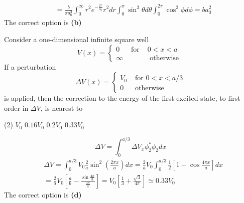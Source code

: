 \begin{enumerate}
\begin{answer}
\begin{align*}
	&=\frac{b}{\pi a_{0}^{3}} \int_{0}^{\infty} r^{2} e^{-\frac{2 r}{a_{0}}} r^{2} d r \int_{0}^{\pi} \sin ^{3} \theta d \theta \int_{0}^{2 \pi} \cos ^{2} \phi d \phi=b a_{0}^{2}
	\end{align*}
	The correct option is \textbf{(b)}
\end{answer}
\begin{minipage}{\textwidth}
	\item Consider a one-dimensional infinite square well
	$$
	V(x)=\left\{\begin{array}{lll}
	0 & \text { for } & 0<x<a \\
	\infty & & \text { otherwise }
	\end{array}\right.
	$$
	If a perturbation
	$$
	\Delta V(x)=\left\{\begin{array}{lc}
	V_{0} & \text { for } 0<x<a / 3 \\
	0 & \text { otherwise }
	\end{array}\right.
	$$
	is applied, then the correction to the energy of the first excited state, to first order in $\Delta V$, is nearest to
\end{minipage}
\begin{tasks}(2)
	\task[\textbf{A.}] $V_{0}$
	\task[\textbf{B.}]$0.16 V_{0}$
	\task[\textbf{C.}]$0.2 V_{0}$
	\task[\textbf{D.}]$0.33 V_{0}$
\end{tasks}
\begin{answer}
	$$\Delta V=\int_{0}^{a / 3} \Delta V_{x} \phi_{2}^{*} \phi_{2} d x$$
	\begin{align*}
	&\Delta V=\int_{0}^{a / 3} V_{0} \frac{2}{a} \sin ^{2}\left(\frac{2 \pi x}{a}\right) d x=\frac{2}{a} V_{0} \int_{0}^{a / 3} \frac{1}{2}\left[1-\cos \frac{4 \pi x}{a}\right] d x \\
	&=\frac{2}{a} V_{0}\left[\frac{a}{6}-\frac{\sin \frac{4 \pi}{3}}{\frac{4 \pi}{a}}\right]=V_{0}\left[\frac{1}{3}+\frac{\sqrt{3}}{4 \pi}\right] \simeq 0.33 V_{0}
	\end{align*}
	The correct option is \textbf{(d)}	
\end{answer}
\end{enumerate}







